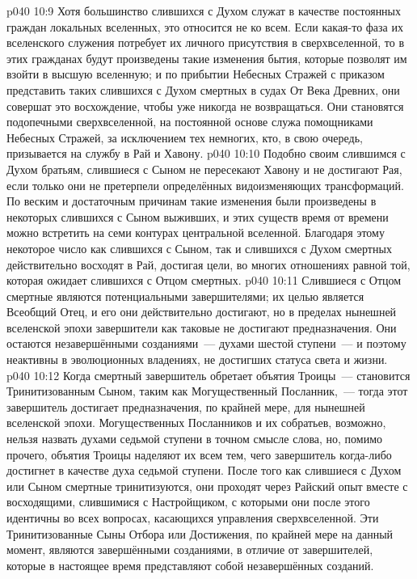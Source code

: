 \vs p040 10:9 \pc Хотя большинство слившихся с Духом служат в качестве постоянных граждан локальных вселенных, это относится не ко всем. Если какая-то фаза их вселенского служения потребует их личного присутствия в сверхвселенной, то в этих гражданах будут произведены такие изменения бытия, которые позволят им взойти в высшую вселенную; и по прибытии Небесных Стражей с приказом представить таких слившихся с Духом смертных в судах От Века Древних, они совершат это восхождение, чтобы уже никогда не возвращаться. Они становятся подопечными сверхвселенной, на постоянной основе служа помощниками Небесных Стражей, за исключением тех немногих, кто, в свою очередь, призывается на службу в Рай и Хавону.
\vs p040 10:10 Подобно своим слившимся с Духом братьям, слившиеся с Сыном не пересекают Хавону и не достигают Рая, если только они не претерпели определённых видоизменяющих трансформаций. По веским и достаточным причинам такие изменения были произведены в некоторых слившихся с Сыном выживших, и этих существ время от времени можно встретить на семи контурах центральной вселенной. Благодаря этому некоторое число как слившихся с Сыном, так и слившихся с Духом смертных действительно восходят в Рай, достигая цели, во многих отношениях равной той, которая ожидает слившихся с Отцом смертных.
\vs p040 10:11 Слившиеся с Отцом смертные являются потенциальными завершителями; их целью является Всеобщий Отец, и его они действительно достигают, но в пределах нынешней вселенской эпохи завершители как таковые не достигают предназначения. Они остаются незавершёнными созданиями~--- духами шестой ступени~--- и поэтому неактивны в эволюционных владениях, не достигших статуса света и жизни.
\vs p040 10:12 Когда смертный завершитель обретает объятия Троицы~--- становится Тринитизованным Сыном, таким как Могущественный Посланник,~--- тогда этот завершитель достигает предназначения, по крайней мере, для нынешней вселенской эпохи. Могущественных Посланников и их собратьев, возможно, нельзя назвать духами седьмой ступени в точном смысле слова, но, помимо прочего, объятия Троицы наделяют их всем тем, чего завершитель когда-либо достигнет в качестве духа седьмой ступени. После того как слившиеся с Духом или Сыном смертные тринитизуются, они проходят через Райский опыт вместе с восходящими, слившимися с Настройщиком, с которыми они после этого идентичны во всех вопросах, касающихся управления сверхвселенной. Эти Тринитизованные Сыны Отбора или Достижения, по крайней мере на данный момент, являются завершёнными созданиями, в отличие от завершителей, которые в настоящее время представляют собой незавершённых созданий.
